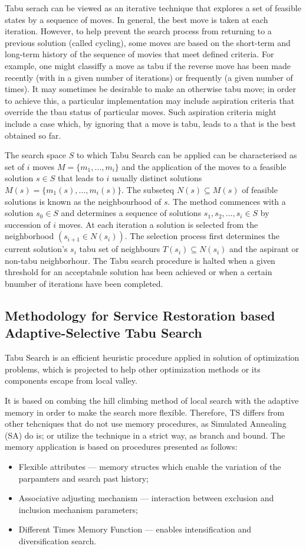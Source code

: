 Tabu serach can be viewed as an iterative technique that explores a set of feasible states by a sequence of moves. In general, the best move is taken at each iteration. However, to help prevent the search process from returning to a previous solution (called cycling), some moves are based on the short-term and long-term history of the sequence of movies that meet defined criteria. For example, one might classiffy a move as tabu if the reverse move has been made recently (with in a given number of iterations) or frequently (a given number of times). It may sometimes be desirable to make an otherwise tabu move; in order to achieve this, a particular implementation may include aspiration criteria that override the tbau status of particular moves. Such aspiration criteria might include a case which, by ignoring that a move is tabu, leads to a that is the best obtained so far.

The search space $S$ to which Tabu Search can be applied can be characterised as set of $i$ moves $M = \{ m_1,\dots,m_i \}$ and the application of the moves to a feasible solution $s \in S$ that leads to $i$ usually distinct solutions $M(s)=\{m_1(s),\dots,m_i(s)\}$. The subseteq $N(s) \subseteq M(s)$ of feasible solutions is known as the neighbourhood of $s$. The method commences with a solution $s_0 \in S$ and determines a sequence of solutions $s_1,s_2,\dots,s_i \in S$ by succession of $i$ moves. At each iteration a solution is selected from the neighborhood $(s_{i+1} \in N(s_i))$. The selection process first determines the current solution's $s_i$ tabu set of neighbours $T(s_i)\subseteq N(s_i)$ and the aspirant or non-tabu neighborhour. The Tabu search procedure is halted when a given threshold for an acceptabnle solution has been achieved or when a certain bnumber of iterations have been completed.

\subsection{Methodology for Service Restoration based Adaptive-Selective Tabu Search}
Tabu Search is an efficient heuristic procedure applied in solution of optimization problems, which is projected to help other optimization methods or its components escape from local valley.

It is based on combing the hill climbing method of local search with the adaptive memory in order to make the search more flexible. Therefore, TS differs from other tehcniques that do not use memory procedures, as Simulated Annealing (SA) do is; or utilize the technique in a strict way, as branch and bound. The memory application is based on procedures presented as follows:
\begin{itemize}
\item Flexible attributes --- memory structes which enable the variation of the parpamters and search past history;
\item Associative adjusting mechanism --- interaction between exclusion and inclusion mechanism parameters;
\item Different Times Memory Function --- enables intensification and diversification search.
\end{itemize}

